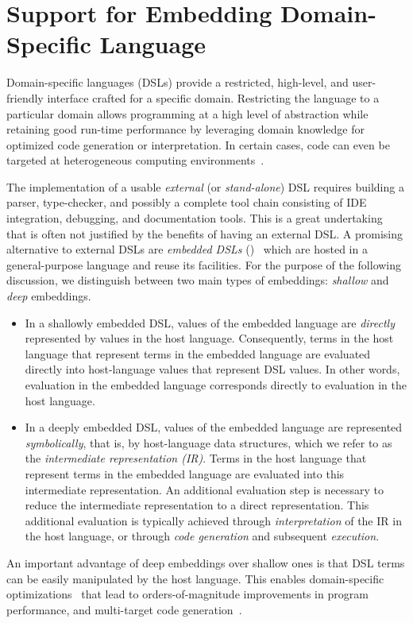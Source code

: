 \chapter{Support for Embedding Domain-Specific Language }


Domain-specific languages (DSLs) provide a restricted,
high-level, and user-friendly interface crafted for a specific domain.
Restricting the language to a particular domain allows programming at
a high level of abstraction while retaining good run-time performance
by leveraging domain knowledge for optimized code generation or
interpretation.  In certain cases, code can even be targeted at
heterogeneous computing environments~\cite{rompf_optimizing_2013}.

The implementation of a usable \emph{external} (or \emph{stand-alone})
DSL requires building a parser, type-checker, and possibly a complete
tool chain consisting of IDE integration, debugging, and documentation
tools. This is a great undertaking that is often not justified by the
benefits of having an external DSL.  A promising alternative to
external DSLs are \emph{embedded DSLs} (\edsls)~\cite{Hudak96csur}
which are hosted in a general-purpose language and reuse its
facilities. For the purpose of the following discussion, we
distinguish between two main types of embeddings: \emph{shallow} and
\emph{deep} embeddings.
  \begin{itemize}
  \item In a shallowly embedded DSL, values of the embedded language
    are \emph{directly} represented by values in the host language.
    Consequently, terms in the host language that represent terms in
    the embedded language are evaluated directly into host-language
    values that represent DSL values. In other words, evaluation in
    the embedded language corresponds directly to evaluation in the
    host language.
  \item In a deeply embedded DSL, values of the embedded language are
    represented \emph{symbolically}, that is, by host-language data
    structures, which we refer to as the \emph{intermediate
      representation (IR)}. Terms in the host language that represent
    terms in the embedded language are evaluated into this intermediate
    representation. An additional evaluation step is necessary to
    reduce the intermediate representation to a direct representation.
    This additional evaluation is typically achieved through
    \emph{interpretation} of the IR in the host language, or through
    \emph{code generation} and subsequent \emph{execution}.
  \end{itemize}
  An important advantage of deep embeddings over shallow ones is that DSL
  terms can be easily manipulated by the host language. This enables domain-specific
  optimizations~\cite{rompf_lightweight_2012,rompf_optimizing_2013}
  that lead to orders-of-magnitude improvements in program performance, and
  multi-target code generation~\cite{brown_heterogeneous_2011}.
%

